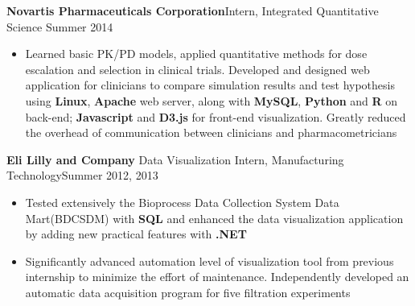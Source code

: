 \documentclass[10.5pt]{res} %
\begin{document}
\begin{resume}
\begin{itemize}
		\end{itemize}
	\textbf{Novartis Pharmaceuticals Corporation}\quad Intern, Integrated Quantitative Science   \hfill Summer 2014
		\begin{itemize}\itemsep -1pt
			\item Learned basic PK/PD models, applied quantitative methods  for dose escalation and selection in clinical  trials. Developed and designed web application for clinicians to compare simulation results and test hypothesis using \textbf{Linux}, \textbf{Apache} web server, along with \textbf{MySQL}, \textbf{Python} and \textbf{R} on back-end;  \textbf{Javascript}  and \textbf{D3.js} for front-end visualization. Greatly reduced the overhead of communication between clinicians and  pharmacometricians					
		\end{itemize}
    \textbf{Eli Lilly and Company} Data Visualization Intern, Manufacturing Technology\hfill Summer 2012, 2013
        \begin{itemize}\itemsep -1pt
           	\item Tested extensively the Bioprocess Data Collection System Data Mart(BDCSDM) with \textbf{SQL} and enhanced the data visualization application by adding new practical features with \textbf{.NET}
            \item Significantly advanced automation level of visualization tool  from previous internship to minimize the effort of maintenance. Independently developed an automatic data acquisition program for five filtration experiments

\end{itemize}
\end{resume}
\end{document}
